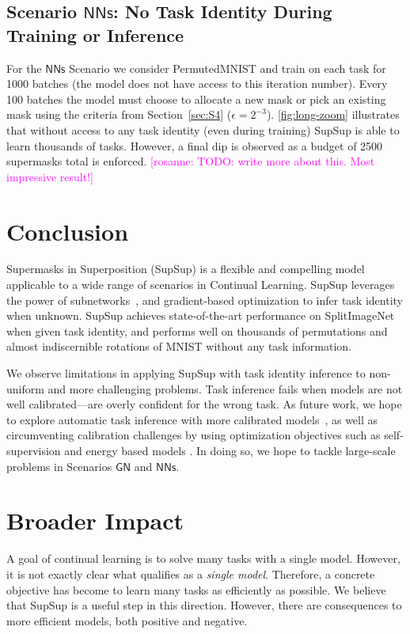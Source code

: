 \documentclass{article}
\newcommand{\ac}{SupSup\xspace}
\newcommand{\comments}[1]{#1}
\newcommand{\comments}[1]{}
\newcommand{\rosanne}[1]{\comments{\textcolor{magenta}{[rosanne: #1]}}}
\newcommand{\casename}[1]{\ensuremath{\mathsf{#1}}\xspace}
\begin{document}
\subsection{Scenario \casename{NNs}: No Task Identity During Training or Inference}
\label{sec:exp-s4}
For the \casename{NNs} Scenario we consider PermutedMNIST and train on each task for 1000 batches (the model does not have access to this iteration number). Every 100 batches the model must choose to allocate a new mask or pick an existing mask using the criteria from Section~\ref{sec:S4} ($\epsilon = 2^{-3}$). \autoref{fig:long-zoom} illustrates that without access to any task identity (even during training) SupSup is able to learn thousands of tasks. However, a final dip is observed as a budget of 2500 supermasks total is enforced. \rosanne{TODO: write more about this. Most impressive result!}

\section{Conclusion}
Supermasks in Superposition (\ac) is a flexible and compelling model applicable to a wide range of scenarios in Continual Learning. \ac leverages the power of subnetworks~\cite{zhou2019deconstructing, ramanujan2019s, mallya2018packnet}, and gradient-based optimization to infer task identity when unknown. 
\ac achieves state-of-the-art performance on SplitImageNet when given task identity, and performs well on thousands of permutations and almost indiscernible rotations of MNIST without any task information. 

We observe limitations in applying SupSup with task identity inference to non-uniform and more challenging problems. Task inference fails when models are not well calibrated---are overly confident for the wrong task. As future work, we hope to explore
automatic task inference with more calibrated models~\cite{guo2017calibration}, as well as circumventing calibration challenges by using  optimization objectives such as self-supervision \cite{he2019momentum} and energy based models \cite{grathwohl2019your}. In doing so, we hope to tackle large-scale problems in Scenarios \casename{GN} and \casename{NNs}.

\section*{Broader Impact}

A goal of continual learning is to solve many tasks with a single model. However, it is not exactly clear what qualifies as a \textit{single model}. Therefore, a concrete objective has become to learn many tasks as efficiently as possible. We believe that \ac is a useful step in this direction. However, there are consequences to more efficient models, both positive and negative.
\end{document}
